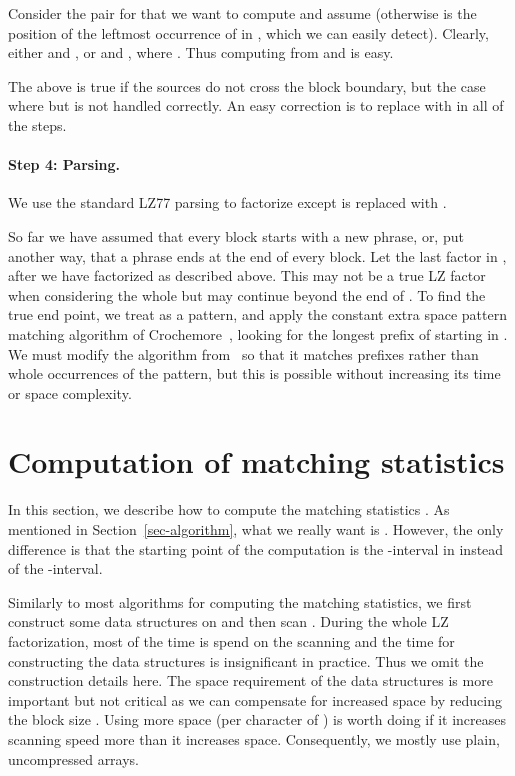 \documentclass[runningheads]{llncs}
\begin{document}
{Consider the pair  for 
that we want to compute and assume  (otherwise  is the position
of the leftmost occurrence of  in , which we can easily detect).
Clearly, either  and , or 
and , where .
Thus computing  from
 and  is easy. 

The above is true if the sources do not cross the block
boundary, but the case where  but  is not
handled correctly. An easy correction is to replace  with
 in all of the steps. 

\paragraph{Step 4: Parsing.}

We use the standard LZ77 parsing to factorize  except
 is replaced with .

So far we have assumed that every block starts with a new phrase, or,
put another way, that a phrase ends at the end of every block. Let
 the last factor in , after we have factorized 
as described above. This may not be a true LZ factor when considering
the whole  but may continue beyond the end of .
To find
the true end point, we treat
 as a pattern, and apply the constant
extra space pattern matching algorithm of Crochemore~\cite{c1992}, looking for
the longest prefix of  starting in . We must
modify the algorithm from~\cite{c1992} so that it matches prefixes
rather than whole occurrences of the pattern, but this is possible
without increasing its time or space
complexity.

\section{Computation of matching statistics}
\label{sec-ms}

In this section, we describe how to compute the matching statistics 
. As mentioned in Section~\ref{sec-algorithm}, what 
we really want is . However, the only difference
is that the starting point of the computation is the -interval in
 instead of the -interval.

Similarly to most algorithms for computing the matching statistics, 
we first construct some data structures on  and then scan
. During the whole LZ factorization, most of the time is spend on
the scanning and the time for constructing the data structures is
insignificant in practice. Thus we omit the construction details here.
The space requirement of the data structures is more important but not
critical as we can compensate for increased space by
reducing the block size . Using more space (per character of )
is worth doing if it increases scanning speed more than it increases
space. Consequently, we mostly use plain, uncompressed
arrays.

}
\end{document}

